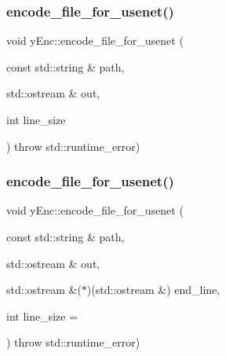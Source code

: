 \subsubsection{\texorpdfstring{encode\+\_\+file\+\_\+for\+\_\+usenet()}{encode\_file\_for\_usenet()}\hspace{0.1cm}{\footnotesize\ttfamily [1/2]}}
{\footnotesize\ttfamily void y\+Enc\+::encode\+\_\+file\+\_\+for\+\_\+usenet (\begin{DoxyParamCaption}\item[{const std\+::string \&}]{path,  }\item[{std\+::ostream \&}]{out,  }\item[{int}]{line\+\_\+size }\end{DoxyParamCaption}) throw  std\+::runtime\+\_\+error) }

\hypertarget{namespacey_enc_a7284d85b7024d64df6d7d7634b141017}{}\label{namespacey_enc_a7284d85b7024d64df6d7d7634b141017} 
\subsubsection{\texorpdfstring{encode\+\_\+file\+\_\+for\+\_\+usenet()}{encode\_file\_for\_usenet()}\hspace{0.1cm}{\footnotesize\ttfamily [2/2]}}
{\footnotesize\ttfamily void y\+Enc\+::encode\+\_\+file\+\_\+for\+\_\+usenet (\begin{DoxyParamCaption}\item[{const std\+::string \&}]{path,  }\item[{std\+::ostream \&}]{out,  }\item[{std\+::ostream \&($\ast$)(std\+::ostream \&)}]{end\+\_\+line,  }\item[{int}]{line\+\_\+size = {} }\end{DoxyParamCaption}) throw  std\+::runtime\+\_\+error) }

